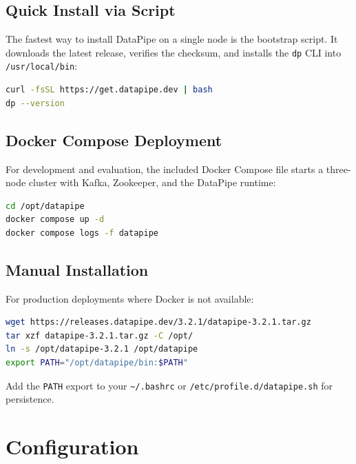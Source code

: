 \documentclass[
    language=english,
    doctype=manual,
    institution=none,
    titlestyle=book,
    oneside,
]{../../omnilatex}
\begin{document}
\section{Quick Install via Script}

The fastest way to install DataPipe on a single node is the bootstrap
script. It downloads the latest release, verifies the checksum, and
installs the \texttt{dp} CLI into \texttt{/usr/local/bin}:

\begin{lstlisting}[language=bash, caption={Bootstrap installation script.}]
curl -fsSL https://get.datapipe.dev | bash
dp --version
\end{lstlisting}

\section{Docker Compose Deployment}

For development and evaluation, the included Docker Compose file starts a
three-node cluster with Kafka, Zookeeper, and the DataPipe runtime:

\begin{lstlisting}[language=bash, caption={Start the development cluster.}]
cd /opt/datapipe
docker compose up -d
docker compose logs -f datapipe
\end{lstlisting}

\section{Manual Installation}

For production deployments where Docker is not available:

\begin{lstlisting}[language=bash, caption={Manual tarball installation.}]
wget https://releases.datapipe.dev/3.2.1/datapipe-3.2.1.tar.gz
tar xzf datapipe-3.2.1.tar.gz -C /opt/
ln -s /opt/datapipe-3.2.1 /opt/datapipe
export PATH="/opt/datapipe/bin:$PATH"
\end{lstlisting}

Add the \texttt{PATH} export to your \texttt{\textasciitilde/.bashrc} or
\texttt{/etc/profile.d/datapipe.sh} for persistence.

\chapter{Configuration}
\label{sec:configuration}
\end{document}
